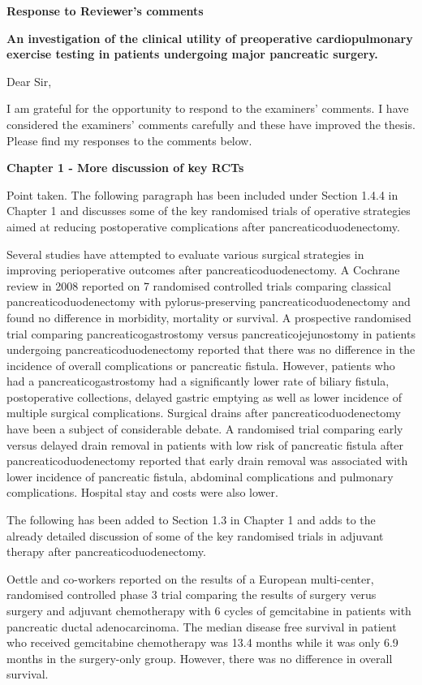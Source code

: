 \documentclass[12pt,a4paper]{article}
\author{Vishnu V Chandrabalan}
\begin{document}
\textbf{Response to Reviewer’s comments}
	
\textbf{An investigation of the clinical utility of preoperative cardiopulmonary exercise testing in patients undergoing major pancreatic surgery.}
	
Dear Sir,
	
I am grateful for the opportunity to respond to the examiners' comments. 
I have considered the examiners' comments carefully and these have improved the thesis. 
Please find my responses to the comments below.
	
\textbf{Chapter 1 - More discussion of key RCTs}

	Point taken.	
	The following paragraph has been included under Section 1.4.4 in Chapter 1 and discusses some of the key randomised trials of operative strategies aimed at reducing postoperative complications after pancreaticoduodenectomy.
	
	Several studies have attempted to evaluate various surgical strategies in improving perioperative outcomes after pancreaticoduodenectomy. 
	A Cochrane review in 2008 reported on 7 randomised controlled trials comparing classical pancreaticoduodenectomy with pylorus-preserving pancreaticoduodenectomy  and found no difference in morbidity, mortality or survival. 
	A prospective randomised trial comparing pancreaticogastrostomy versus pancreaticojejunostomy in patients undergoing pancreaticoduodenectomy reported that there was no difference in the incidence of overall complications or pancreatic fistula. 
	However, patients who had a pancreaticogastrostomy had a significantly lower rate of biliary fistula, postoperative collections, delayed gastric emptying as well as lower incidence of multiple surgical complications. 
	Surgical drains after pancreaticoduodenectomy have been a subject of considerable debate. 
	A randomised trial comparing early versus delayed drain removal in patients with low risk of pancreatic fistula after pancreaticoduodenectomy reported that early drain removal was associated with lower incidence of pancreatic fistula, abdominal complications and pulmonary complications. 
	Hospital stay and costs were also lower.
	
	The following has been added to Section 1.3 in Chapter 1 and adds to the already detailed discussion of some of the key randomised trials in adjuvant therapy after pancreaticoduodenectomy.
	
	Oettle and co-workers reported on the results of a European multi-center, randomised controlled phase 3 trial comparing the results of surgery verus surgery and adjuvant chemotherapy with 6 cycles of gemcitabine in patients with pancreatic ductal adenocarcinoma. 
	The median disease free survival in patient who received gemcitabine chemotherapy was 13.4 months while it was only 6.9 months in the surgery-only group. However, there was no difference in overall survival.
	
\end{document}
